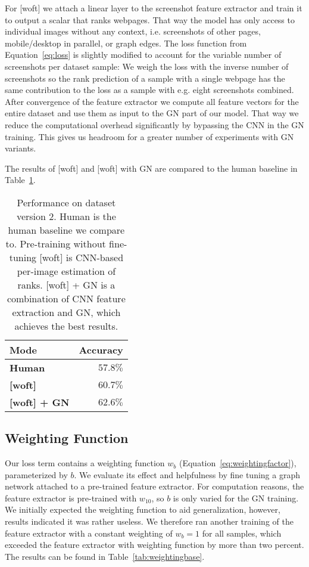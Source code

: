 For [woft] we attach a linear layer to the screenshot feature extractor and train it to output a scalar that ranks webpages. That way the model has only access to individual images without any context, i.e. screenshots of other pages, mobile/desktop in parallel, or graph edges. The loss function from Equation~\ref{eq:loss} is slightly modified to account for the variable number of screenshots per dataset sample: We weigh the loss with the inverse number of screenshots so the rank prediction of a sample with a single webpage has the same contribution to the loss as a sample with e.g. eight screenshots combined. After convergence of the feature extractor we compute all feature vectors for the entire dataset and use them as input to the GN part of our model. That way we reduce the computational overhead significantly by bypassing the CNN in the GN training. This gives us headroom for a greater number of experiments with GN variants.

The results of [woft] and [woft] with GN are compared to the human baseline in Table~\ref{tab:accuracyonv2}.

\begin{table}
    \centering
    \begin{tabular}{lr}
        \textbf{Mode} & \textbf{Accuracy}\\\hline
        \textbf{Human} & $57.8\%$\\
        \textbf{[woft]} & $60.7\%$\\
        \textbf{[woft] + GN} & $\bm{62.6}\%$\\
    \end{tabular}
    \caption[Performance on dataset version 2]{Performance on dataset version 2. Human is the human baseline we compare to. Pre-training without fine-tuning [woft] is CNN-based per-image estimation of ranks. [woft] + GN is a combination of CNN feature extraction and GN, which achieves the best results.}
    \label{tab:accuracyonv2}
\end{table}

\subsection{Weighting Function}

Our loss term contains a weighting function $w_b$ (Equation~\ref{eq:weightingfactor}), parameterized by $b$. We evaluate its effect and helpfulness by fine tuning a graph network attached to a pre-trained feature extractor. For computation reasons, the feature extractor is pre-trained with $w_{10}$, so $b$ is only varied for the GN training. We initially expected the weighting function to aid generalization, however, results indicated it was rather useless. We therefore ran another training of the feature extractor with a constant weighting of $w_b=1$ for all samples, which exceeded the feature extractor with weighting function by more than two percent. The results can be found in Table~\ref{tab:weightingbase}.

